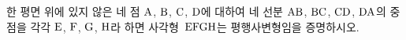 한 평면 위에 있지 않은 네 점 $\mathrm{A}$, $\mathrm{B}$, $\mathrm{C}$, $\mathrm{D}$에 대하여 네 선분 $\mathrm{AB}$, $\mathrm{BC}$, $\mathrm{CD}$, $\mathrm{DA}$의 중점을 각각 $\mathrm{E}$, $\mathrm{F}$, $\mathrm{G}$, $\mathrm{H}$라 하면 사각형~$\mathrm{EFGH}$는 평행사변형임을 증명하시오.
